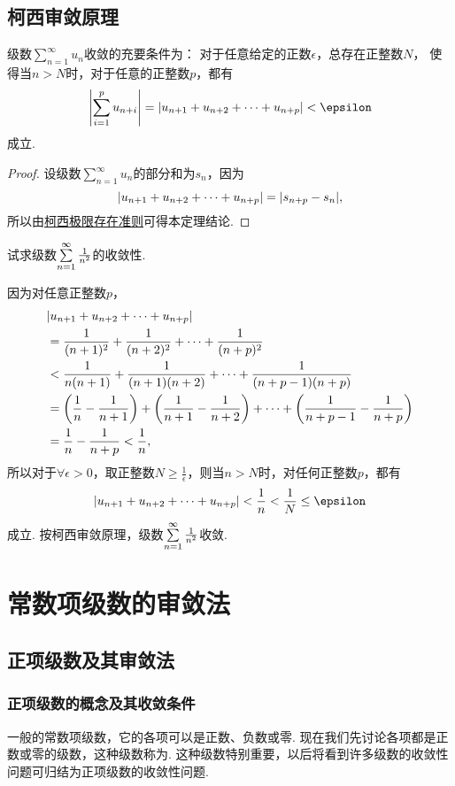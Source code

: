 \subsection{柯西审敛原理}
\begin{theorem}[柯西审敛原理]\label{theorem:无穷级数.级数的柯西审敛原理}
级数\(\sum\limits_{n=1}^\infty u_n\)收敛的充要条件为：
对于任意给定的正数\(\epsilon\)，总存在正整数\(N\)，
使得当\(n>N\)时，对于任意的正整数\(p\)，都有\[
\abs{ \sum\limits_{i=1}^p u_{n+i} }
= \abs{u_{n+1}+u_{n+2}+\dotsb+u_{n+p}}
< \epsilon
\]成立.
\begin{proof}
设级数\(\sum\limits_{n=1}^\infty u_n\)的部分和为\(s_n\)，因为\[
\abs{u_{n+1}+u_{n+2}+\dotsb+u_{n+p}} = \abs{s_{n+p}-s_n},
\]所以由\hyperref[theorem:极限.数列的柯西极限存在准则]{柯西极限存在准则}可得本定理结论.
\end{proof}
\end{theorem}

\begin{example}
试求级数\(\sum\limits_{n=1}^\infty \frac{1}{n^2}\)的收敛性.
\begin{solution}
因为对任意正整数\(p\)，\begin{align*}
&\abs{u_{n+1}+u_{n+2}+\dotsb+u_{n+p}} \\
&=\frac{1}{(n+1)^2}+\frac{1}{(n+2)^2}+\dotsb+\frac{1}{(n+p)^2} \\
&<\frac{1}{n(n+1)}+\frac{1}{(n+1)(n+2)}+\dotsb+\frac{1}{(n+p-1)(n+p)} \\
&=\left(\frac{1}{n}-\frac{1}{n+1}\right)+\left(\frac{1}{n+1}-\frac{1}{n+2}\right)+\dotsb+\left(\frac{1}{n+p-1}-\frac{1}{n+p}\right) \\
&=\frac{1}{n}-\frac{1}{n+p} < \frac{1}{n},
\end{align*}
所以对于\(\forall \epsilon > 0\)，取正整数\(N \geq \frac{1}{\epsilon}\)，则当\(n > N\)时，对任何正整数\(p\)，都有\[
\abs{u_{n+1}+u_{n+2}+\dotsb+u_{n+p}}
< \frac{1}{n}
< \frac{1}{N}
\leq \epsilon
\]成立.
按柯西审敛原理，级数\(\sum\limits_{n=1}^\infty \frac{1}{n^2}\)收敛.
\end{solution}
\end{example}

\section{常数项级数的审敛法}
\subsection{正项级数及其审敛法}
\subsubsection{正项级数的概念及其收敛条件}
一般的常数项级数，它的各项可以是正数、负数或零.
现在我们先讨论各项都是正数或零的级数，这种级数称为.
这种级数特别重要，以后将看到许多级数的收敛性问题可归结为正项级数的收敛性问题.

